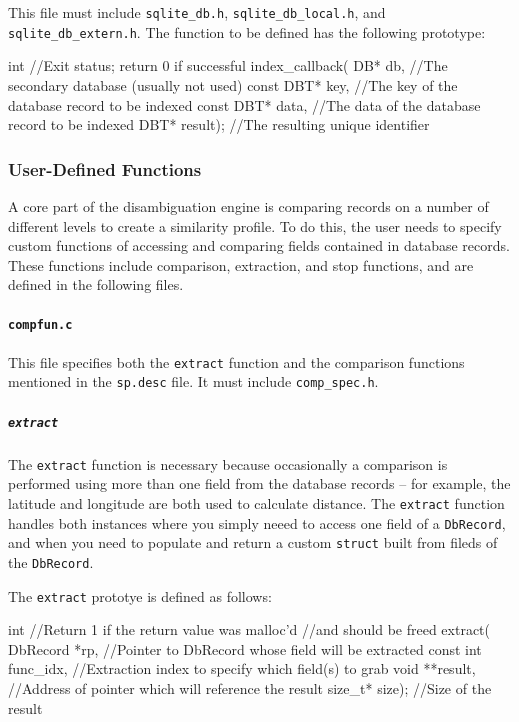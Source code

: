 \documentclass[10pt, letterpaper]{article}
\begin{document}
This file must include \texttt{sqlite\_db.h}, \texttt{sqlite\_db\_local.h}, and \texttt{sqlite\_db\_extern.h}.
The function to be defined has the following prototype:
\begin{verbatimtab}
int                              //Exit status; return 0 if successful
index_callback( DB* db,          //The secondary database (usually not used)
                const DBT* key,  //The key of the database record to be indexed
                const DBT* data, //The data of the database record to be indexed
                DBT* result);    //The resulting unique identifier
\end{verbatimtab}
\subsubsection{User-Defined Functions}
A core part of the disambiguation engine is comparing records on a number of different
levels to create a similarity profile. To do this, the user needs to specify custom
functions of accessing and comparing fields contained in database records. These functions include
comparison, extraction, and stop functions, and are defined in the following files.
\paragraph{\texttt{compfun.c}}
This file specifies both the \texttt{extract} function and the comparison functions mentioned in the \texttt{sp.desc} file. It must include \texttt{comp\_spec.h}.

\subparagraph{\texttt{extract}} The \texttt{extract} function is necessary because occasionally a comparison is performed using more than one field from the database records -- for example, the latitude and longitude are both used to calculate distance. The \texttt{extract} function handles both instances where you simply neeed to access one field of a \texttt{DbRecord}, and when
you need to populate and return a custom \texttt{struct} built from fileds of the \texttt{DbRecord}.

The \texttt{extract} prototye is defined as follows:
\begin{verbatimtab}
int                          //Return 1 if the return value was malloc'd
                             //and should be freed
extract( DbRecord *rp,       //Pointer to DbRecord whose field will be extracted
         const int func_idx, //Extraction index to specify which field(s) to grab
         void **result,      //Address of pointer which will reference the result
         size_t* size);      //Size of the result
\end{verbatimtab}
\end{document}
